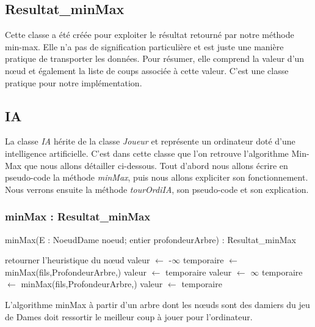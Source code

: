 \documentclass[12,french]{report}
\begin{document}
\subsection{Resultat\_minMax}

Cette classe a été créée pour exploiter le résultat retourné par notre méthode min-max. Elle n'a pas de signification particulière et est juste une manière pratique de transporter les données. Pour résumer, elle comprend la valeur d'un nœud et également la liste de coups associée à cette valeur. C'est une classe pratique pour notre implémentation.

\subsection{IA}

La classe \textit{IA} hérite de la classe \textit{Joueur} et représente un ordinateur doté d'une intelligence artificielle. C'est dans cette classe que l'on retrouve l'algorithme Min-Max que nous allons détailler ci-dessous. Tout d'abord nous allons écrire en pseudo-code la méthode \textit{minMax}, puis nous allons expliciter son fonctionnement. Nous verrons ensuite la méthode \textit{tourOrdiIA}, son pseudo-code et son explication.

\subsubsection{minMax : Resultat\_minMax}

\begin{algorithm}
	\caption{minMax(E : NoeudDame noeud; entier profondeurArbre) : Resultat\_minMax}
	\begin{algorithmic}
		\State retourner l'heuristique du nœud
	\EndIf
		\State valeur $\leftarrow$ -$\infty$
			\State temporaire $\leftarrow$ minMax(fils,ProfondeurArbre,)
				\State valeur $\leftarrow$ temporaire
			\EndIf
		\EndFor
	\Else
		\State valeur $\leftarrow$ $\infty$
		\State temporaire $\leftarrow$ minMax(fils,ProfondeurArbre,)
			\State valeur $\leftarrow$ temporaire
		\EndIf
	\EndIf
	\end{algorithmic}
\end{algorithm}
\vspace{0.4cm}


L'algorithme minMax à partir d'un arbre dont les nœuds sont des damiers du jeu de Dames doit ressortir le meilleur coup à jouer pour l'ordinateur.\\
\end{document}
